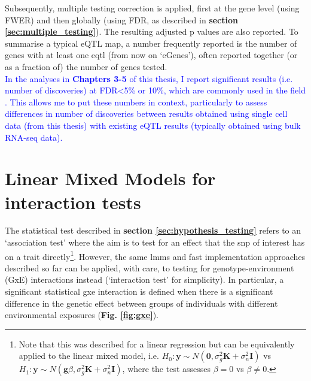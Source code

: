 Subsequently, multiple testing correction is applied, first at the gene level (using FWER) and then globally (using FDR, as described in \textbf{section \ref{sec:multiple_testing}}).
The resulting adjusted p values are also reported.
To summarise a typical eQTL map, a number frequently reported is the number of genes with at least one \gls{eqtl} (from now on `eGenes'), often reported together (or as a fraction of) the number of genes tested. \\

\textcolor{blue}{In the analyses in \textbf{Chapters 3-5} of this thesis, I report significant results (i.e. number of discoveries) at FDR<5\% or 10\%, which are commonly used in the field \cite{kilpinen2017common, gtex2017genetic, aguet2019gtex}.
This allows me to put these numbers in context, particularly to assess differences in number of discoveries between results obtained using single cell data (from this thesis) with existing eQTL results (typically obtained using bulk RNA-seq data).}







\section{Linear Mixed Models for interaction tests}
\label{sec:lmm_gxe}

The  statistical test described in \textbf{section \ref{sec:hypothesis_testing}} refers to an `association test' where the aim is to test for an effect that the \gls{snp} of interest has on a trait directly\footnote{Note that this was described for a linear regression but can be equivalently applied to the linear mixed model, i.e. $H_0: \mathbf{y} \sim N (\mathbf{0}, \sigma_g^2\mathbf{K} + \sigma_n^2\mathbf{I})$ vs $H_1: \mathbf{y} \sim N (\mathbf{g}\beta, \sigma_g^2\mathbf{K} + \sigma_n^2\mathbf{I})$, where the test assesses $\beta = 0$ vs $\beta \neq 0$.}.
However, the same \gls{lmm}s and fast implementation approaches described so far can be applied, with care, to testing for genotype-environment (GxE) interactions instead (`interaction test' for simplicity).
In particular, a significant statistical \gls{gxe} interaction is defined when there is a significant difference in the genetic effect between groups of individuals with different environmental exposures (\textbf{Fig. \ref{fig:gxe}}).

